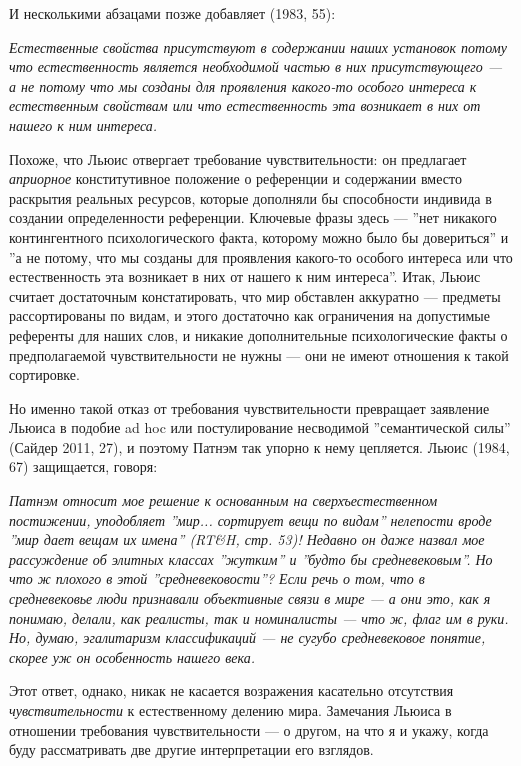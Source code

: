 \documentclass[11pt]{book}
\begin{document}
\smallskip

И несколькими абзацами позже добавляет (1983, 55):

\smallskip

\textit{Естественные свойства присутствуют в содержании наших установок потому что естественность является необходимой частью в них присутствующего --- а не потому что мы созданы для проявления какого-то особого интереса к естественным свойствам или что естественность эта возникает в них от нашего к ним интереса.}

\smallskip

Похоже, что Льюис отвергает требование чувствительности: он предлагает \textit{априорное} конститутивное положение о референции и содержании вместо раскрытия реальных ресурсов, которые дополняли бы способности индивида в создании определенности референции. Ключевые фразы здесь --- ''нет никакого контингентного психологического факта, которому можно было бы довериться'' и ''а не потому, что мы созданы для проявления какого-то особого интереса или что естественность эта возникает в них от нашего к ним интереса''. Итак, Льюис считает достаточным констатировать, что мир обставлен аккуратно --- предметы рассортированы по видам, и этого достаточно как ограничения на допустимые референты для наших слов, и никакие дополнительные психологические факты о предполагаемой чувствительности не нужны --- они не имеют отношения к такой сортировке.

Но именно такой отказ от требования чувствительности превращает заявление Льюиса в подобие ad hoc или постулирование несводимой ''семантической силы'' (Сайдер 2011, 27), и поэтому Патнэм так упорно к нему цепляется. Льюис (1984, 67) защищается, говоря:

\smallskip

\textit{Патнэм относит мое решение к основанным на сверхъестественном постижении, уподобляет ''мир... сортирует вещи по видам'' нелепости вроде ''мир дает вещам их имена'' (RT&H, стр. 53)! Недавно он даже назвал мое рассуждение об элитных классах ''жутким'' и ''будто бы средневековым''. Но что ж плохого в этой ''средневековости''? Если речь о том, что в средневековье люди признавали объективные связи в мире --- а они это, как я понимаю, делали, как реалисты, так и номиналисты --- что ж, флаг им в руки. Но, думаю, эгалитаризм классификаций --- не сугубо средневековое понятие, скорее уж он особенность нашего века.}

\smallskip

Этот ответ, однако, никак не касается возражения касательно отсутствия \textit{чувствительности} к естественному делению мира. Замечания Льюиса в отношении требования чувствительности --- о другом, на что я и укажу, когда буду рассматривать две другие интерпретации его взглядов.
\end{document}
